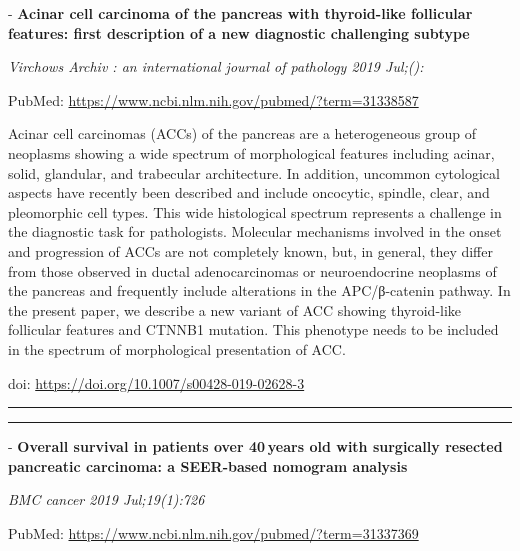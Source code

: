 \documentclass[]{article}
\begin{document}
 - \textbf{Acinar cell carcinoma of the pancreas with thyroid-like
follicular features: first description of a new diagnostic challenging
subtype}

\emph{Virchows Archiv : an international journal of pathology 2019
Jul;():}

PubMed: \url{https://www.ncbi.nlm.nih.gov/pubmed/?term=31338587}

Acinar cell carcinomas (ACCs) of the pancreas are a heterogeneous group
of neoplasms showing a wide spectrum of morphological features including
acinar, solid, glandular, and trabecular architecture. In addition,
uncommon cytological aspects have recently been described and include
oncocytic, spindle, clear, and pleomorphic cell types. This wide
histological spectrum represents a challenge in the diagnostic task for
pathologists. Molecular mechanisms involved in the onset and progression
of ACCs are not completely known, but, in general, they differ from
those observed in ductal adenocarcinomas or neuroendocrine neoplasms of
the pancreas and frequently include alterations in the APC/β-catenin
pathway. In the present paper, we describe a new variant of ACC showing
thyroid-like follicular features and CTNNB1 mutation. This phenotype
needs to be included in the spectrum of morphological presentation of
ACC.

doi: \url{https://doi.org/10.1007/s00428-019-02628-3}

{}

{}

\begin{center}\rule{0.5\linewidth}{\linethickness}\end{center}

\begin{center}\rule{0.5\linewidth}{\linethickness}\end{center}

 - \textbf{Overall survival in patients over 40 years old with
surgically resected pancreatic carcinoma: a SEER-based nomogram
analysis}

\emph{BMC cancer 2019 Jul;19(1):726}

PubMed: \url{https://www.ncbi.nlm.nih.gov/pubmed/?term=31337369}
\end{document}
